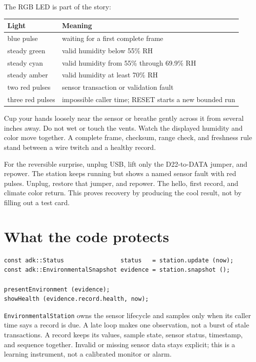 \documentclass[11pt]{article}
\begin{document}
The RGB LED is part of the story:

\begin{tabularx}{\linewidth}{@{}l X@{}}
\toprule
Light & Meaning\\
\midrule
blue pulse & waiting for a first complete frame\\
steady green & valid humidity below 55\% RH\\
steady cyan & valid humidity from 55\% through 69.9\% RH\\
steady amber & valid humidity at least 70\% RH\\
two red pulses & sensor transaction or validation fault\\
three red pulses & impossible caller time; RESET starts a new bounded run\\
\bottomrule
\end{tabularx}

Cup your hands loosely near the sensor or breathe gently across it from several
inches away. Do not wet or touch the vents. Watch the displayed humidity and
color move together. A complete frame, checksum, range check, and freshness
rule stand between a wire twitch and a healthy record.

For the reversible surprise, unplug USB, lift only the D22-to-DATA jumper, and
repower. The station keeps running but shows a named sensor fault with red
pulses. Unplug, restore that jumper, and repower. The hello, first record, and
climate color return. This proves recovery by producing the cool result, not
by filling out a test card.

\section{What the code protects}

\begin{lstlisting}[style=adkcpp]
const adk::Status                status   = station.update (now);
const adk::EnvironmentalSnapshot evidence = station.snapshot ();

presentEnvironment (evidence);
showHealth (evidence.record.health, now);
\end{lstlisting}

\texttt{EnvironmentalStation} owns the sensor lifecycle and samples only when
its caller time says a record is due. A late loop makes one observation, not a
burst of stale transactions. A record keeps its values, sample state, sensor
status, timestamp, and sequence together. Invalid or missing sensor data stays
explicit; this is a learning instrument, not a calibrated monitor or alarm.
\end{document}
